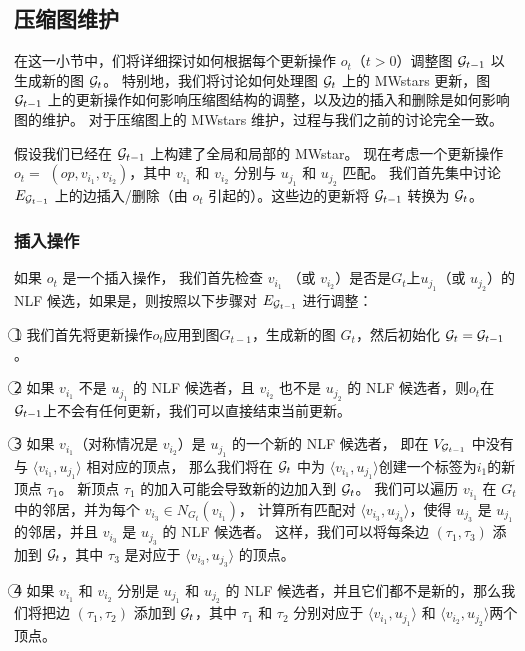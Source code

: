 \subsection{压缩图维护}\label{compact-graph-weihu}
在这一小节中，们将详细探讨如何根据每个更新操作 $o_t$（$t>0$）调整图 $\mathcal{G}_{t-1}$ 以生成新的图 $\mathcal{G}_t$。
特别地，我们将讨论如何处理图 $\mathcal{G}_t$ 上的 MWstars 更新，图 $\mathcal{G}_{t-1}$ 上的更新操作如何影响压缩图结构的调整，以及边的插入和删除是如何影响图的维护。
对于压缩图上的 MWstars 维护，过程与我们之前的讨论完全一致。

假设我们已经在 $\mathcal{G}_{t-1}$ 上构建了全局和局部的 MWstar。
现在考虑一个更新操作 $o_t=$ $(op, v_{i_1}, v_{i_2})$，其中 $v_{i_1}$ 和 $v_{i_2}$ 分别与 $u_{j_1}$ 和 $u_{j_2}$ 匹配。
%
我们首先集中讨论 $E_{\mathcal{G}_{t-1}}$ 上的边插入/删除（由 $o_t$ 引起的）。这些边的更新将 $\mathcal{G}_{t-1}$ 转换为 $\mathcal{G}_t$。

\subsubsection{插入操作}
如果 $o_t$ 是一个插入操作，
我们首先检查 $v_{i_1}$ （或 $v_{i_2}$）是否是$G_t$上$u_{j_1}$（或 $u_{j_2}$）的 NLF 候选，如果是，则按照以下步骤对 $E_{\mathcal{G}_{t-1}}$ 进行调整：

\textcircled{1} 我们首先将更新操作$o_t$应用到图$G_{t-1}$，生成新的图 $G_t$，然后初始化 $\mathcal{G}_t = \mathcal{G}_{t-1}$。

\textcircled{2} 如果 $v_{i_1}$ 不是 $u_{j_1}$ 的 NLF 候选者，且 $v_{i_2}$ 也不是 $u_{j_2}$ 的 NLF 候选者，则$o_t$在$\mathcal{G}_{t-1}$上不会有任何更新，我们可以直接结束当前更新。

\textcircled{3} 如果 $v_{i_1}$（对称情况是 $v_{i_2}$）是 $u_{j_1}$ 的一个新的 NLF 候选者，
即在 $V_{\mathcal{G}_{t-1}}$ 中没有与 $\langle v_{i_1}, u_{j_1} \rangle$ 相对应的顶点，
那么我们将在 $\mathcal{G}_t$ 中为 $\langle v_{i_1}, u_{j_1} \rangle$创建一个标签为$i_1$的新顶点 $\tau_1$。
新顶点 $\tau_1$ 的加入可能会导致新的边加入到 $\mathcal{G}_t$。
我们可以遍历 $v_{i_1}$ 在 $G_t$ 中的邻居，并为每个 $v_{i_3}\in N_{G_t}(v_{i_1})$，
计算所有匹配对 $\langle v_{i_3}, u_{j_3} \rangle$，使得 $u_{j_3}$ 是 $u_{j_1}$ 的邻居，并且 $v_{i_3}$ 是 $u_{j_3}$ 的 NLF 候选者。
这样，我们可以将每条边 $(\tau_1, \tau_3)$ 添加到 $\mathcal{G}_t$，其中 $\tau_3$ 是对应于 $\langle v_{i_3}, u_{j_3} \rangle$ 的顶点。

\textcircled{4} 如果 $v_{i_1}$ 和 $v_{i_2}$ 分别是 $u_{j_1}$ 和 $u_{j_2}$ 的 NLF 候选者，并且它们都不是新的，那么我们将把边 $(\tau_1, \tau_2)$ 添加到 $\mathcal{G}_t$，其中 $\tau_1$ 和 $\tau_2$ 分别对应于 $\langle v_{i_1}, u_{j_1} \rangle$ 和 $\langle v_{i_2}, u_{j_2} \rangle$两个顶点。


